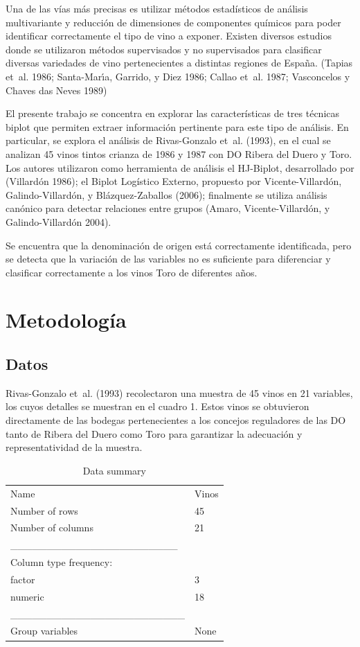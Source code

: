 \documentclass[
  10pt,
  spanish,
]{article}
\begin{document}
Una de las vías más precisas es utilizar métodos estadísticos de
análisis multivariante y reducción de dimensiones de componentes
químicos para poder identificar correctamente el tipo de vino a exponer.
Existen diversos estudios donde se utilizaron métodos supervisados y no
supervisados para clasificar diversas variedades de vino pertenecientes
a distintas regiones de España. (Tapias et~al. 1986; Santa-Marı́a,
Garrido, y Diez 1986; Callao et~al. 1987; Vasconcelos y Chaves das Neves
1989)

El presente trabajo se concentra en explorar las características de tres
técnicas biplot que permiten extraer información pertinente para este
tipo de análisis. En particular, se explora el análisis de Rivas-Gonzalo
et~al. (1993), en el cual se analizan 45 vinos tintos crianza de 1986 y
1987 con DO Ribera del Duero y Toro. Los autores utilizaron como
herramienta de análisis el HJ-Biplot, desarrollado por (Villardón 1986);
el Biplot Logístico Externo, propuesto por Vicente-Villardón,
Galindo-Villardón, y Blázquez-Zaballos (2006); finalmente se utiliza
análisis canónico para detectar relaciones entre grupos (Amaro,
Vicente-Villardón, y Galindo-Villardón 2004).

Se encuentra que la denominación de origen está correctamente
identificada, pero se detecta que la variación de las variables no es
suficiente para diferenciar y clasificar correctamente a los vinos Toro
de diferentes años.

\hypertarget{metodologuxeda}{%
\section{Metodología}\label{metodologuxeda}}

\hypertarget{datos}{%
\subsection{Datos}\label{datos}}

Rivas-Gonzalo et~al. (1993) recolectaron una muestra de 45 vinos en 21
variables, los cuyos detalles se muestran en el cuadro 1. Estos vinos se
obtuvieron directamente de las bodegas pertenecientes a los concejos
reguladores de las DO tanto de Ribera del Duero como Toro para
garantizar la adecuación y representatividad de la muestra.

\begin{longtable}[]{@{}ll@{}}
\caption{Data summary}\tabularnewline
\toprule
\endhead
Name & Vinos\tabularnewline
Number of rows & 45\tabularnewline
Number of columns & 21\tabularnewline
\_\_\_\_\_\_\_\_\_\_\_\_\_\_\_\_\_\_\_\_\_\_\_ &\tabularnewline
Column type frequency: &\tabularnewline
factor & 3\tabularnewline
numeric & 18\tabularnewline
\_\_\_\_\_\_\_\_\_\_\_\_\_\_\_\_\_\_\_\_\_\_\_\_ &\tabularnewline
Group variables & None\tabularnewline
\bottomrule
\end{longtable}
\end{document}
